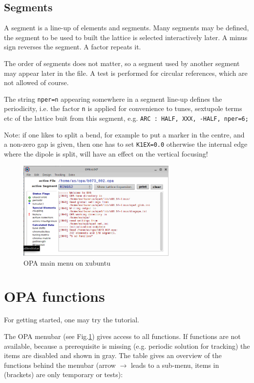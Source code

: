 \documentclass[12pt]{article}
\begin{document}
\subsection{\label{secsegm}Segments}
A segment is a line-up of elements and segments.
Many segments may be defined, the segment to be used to built the lattice is selected interactively later.
A minus sign reverses the segment. A factor repeats it.

The order of segments does not matter, so a segment used by another segment may appear later in the file.
A test is performed for circular references, which are not allowed of course.

The string {\tt nper=n} appearing somewhere in a segment line-up defines the periodicity,
i.e. the factor {\tt n} is applied for convenience to tunes, sextupole terms
etc of the lattice buit from this segment, e.g. {\tt ARC : HALF, XXX, -HALF, nper=6;}

Note: if one likes to split a bend, for example to put a marker in the centre,
and a non-zero gap is given, then one has to set {\tt K1EX=0.0} otherwise the
internal edge where the dipole is split, will have an effect on the vertical focusing!


\begin{figure}[htb]
\centering
\label{figmain}
\includegraphics[width=0.7\textwidth]{mainmenu.png}
\caption{OPA main menu on xubuntu}
\end{figure}

\section{OPA functions}
For getting started, one may try the tutorial. 

The OPA menubar (see Fig.\ref{figmain}) gives access to all functions. If functions are not available, because a prerequisite is
missing (e.g. periodic solution for tracking) the items are disabled and shown in gray.
The table gives an overview of the functions behind the menubar (arrow $\rightarrow$ leads to a sub-menu, items in (brackets) are only temporary or tests):
\end{document}
